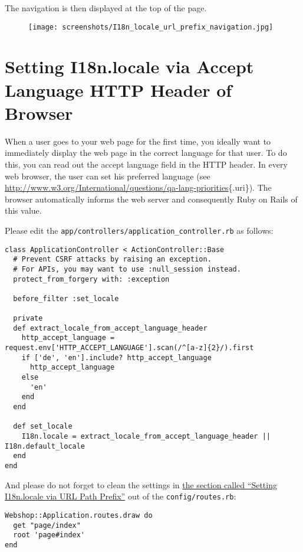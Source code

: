 \documentclass[a4paper]{book}
\begin{document}
The navigation is then displayed at the top of the page.

\begin{figure}[htbp]
\centering
\texttt{[image: screenshots/I18n\_locale\_url\_prefix\_navigation.jpg]}
\end{figure}

\section{Setting I18n.locale via Accept Language HTTP Header of Browser}\label{setting-i18n.locale-via-accept-language-http-header-of-browser}

When a user goes to your web page for the first time, you ideally want to immediately display the web page in the correct language for that user. To do this, you can read out the accept language field in the HTTP header. In every web browser, the user can set his preferred language (see \url{http://www.w3.org/International/questions/qa-lang-priorities}\{.uri\}). The browser automatically informs the web server and consequently Ruby on Rails of this value.

Please edit the \texttt{app/controllers/application\_controller.rb} as follows:

\begin{shaded}\begin{verbatim}
class ApplicationController < ActionController::Base
  # Prevent CSRF attacks by raising an exception.
  # For APIs, you may want to use :null_session instead.
  protect_from_forgery with: :exception

  before_filter :set_locale

  private
  def extract_locale_from_accept_language_header
    http_accept_language = request.env['HTTP_ACCEPT_LANGUAGE'].scan(/^[a-z]{2}/).first
    if ['de', 'en'].include? http_accept_language
      http_accept_language
    else
      'en'
    end
  end

  def set_locale
    I18n.locale = extract_locale_from_accept_language_header || I18n.default_locale
  end
end
\end{verbatim}\end{shaded}

And please do not forget to clean the settings in \hyperref[i18nux5furlux5fpathux5fprefix]{the section called “Setting I18n.locale via URL Path Prefix”} out of the \texttt{config/routes.rb}:

\begin{shaded}\begin{verbatim}
Webshop::Application.routes.draw do
  get "page/index"
  root 'page#index'
end
\end{verbatim}\end{shaded}
\end{document}
